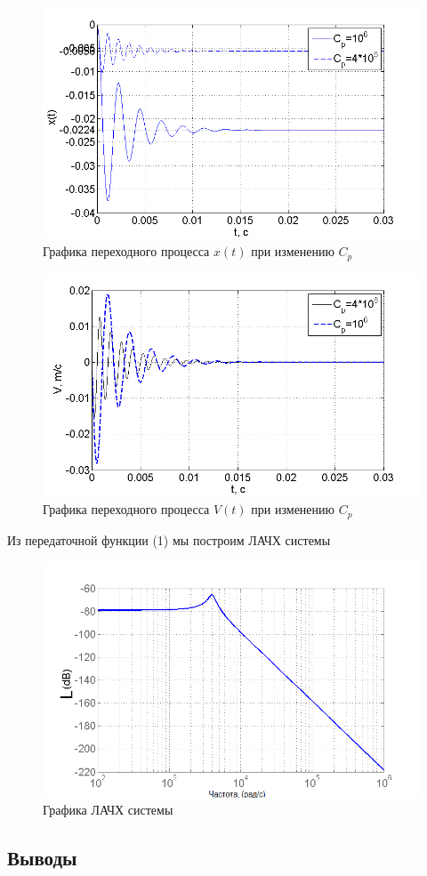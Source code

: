 \documentclass[a4paper, 12pt]{article}
\begin{document}
\begin{figure}[h]
	\centering
	\includegraphics[width=0.7\linewidth]{9}
	\caption{Графика переходного процесса $x(t)$ при изменению $C_{p}$}
	\label{}
\end{figure}
\begin{figure}[h]
	\centering
	\includegraphics[width=0.7\linewidth]{11}
	\caption{Графика переходного процесса $V(t)$ при изменению $C_{p}$}
	\label{}
\end{figure}
\newpage
Из передаточной функции (1) мы построим ЛАЧХ системы 
\begin{figure}[h]
	\centering
	\includegraphics[width=0.7\linewidth]{10}
	\caption{Графика ЛАЧХ системы}
	\label{}
\end{figure}
\newpage
\begin{center}
	\section*{Выводы}
\end{center}\par
\end{document}
